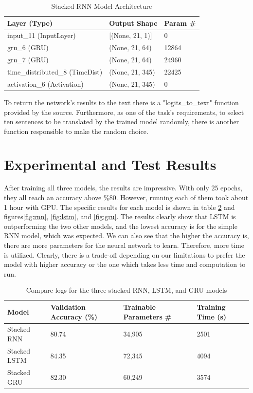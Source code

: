 \documentclass[12pt,oneside,geqno]{article}
\begin{document}
	\begin{table}[h]
		\centering
		\begin{tabular}{|l|l|l|}
			\hline
			Layer (Type)                    & Output Shape        & Param \# \\ \hline
			input\_11 (InputLayer)           & {[}(None, 21, 1){]} & 0        \\ \hline
			gru\_6 (GRU)      & (None, 21, 64)      & 12864     \\ \hline
			gru\_7 (GRU)      & (None, 21, 64)      & 24960     \\ \hline
			time\_distributed\_8 (TimeDist) & (None, 21, 345)     & 22425    \\ \hline
			activation\_6 (Activation)      & (None, 21, 345)     & 0        \\ \hline
		\end{tabular}
		\caption{Stacked RNN Model Architecture}
		\label{t:gru}
	\end{table}
	
	To return the network's results to the text there is a "logits\_to\_text" function provided by the source. Furthermore, as one of the task's requirements, to select ten sentences to be translated by the trained model randomly, there is another function responsible to make the random choice. 
	\pagebreak
	
	\section{Experimental and Test Results}
	After training all three models, the results are impressive. With only 25 epochs, they all reach an accuracy above \%80. However, running each of them took about 1 hour with GPU. The specific results for each model is shown in table \ref{t:compare} and figures\ref{fig:rnn}, \ref{fig:lstm}, and \ref{fig:gru}. The results clearly show that LSTM is outperforming the two other models, and the lowest accuracy is for the simple RNN model, which was expected. We can also see that the higher the accuracy is, there are more parameters for the neural network to learn. Therefore, more time is utilized. Clearly, there is a trade-off depending on our limitations to prefer the model with higher accuracy or the one which takes less time and computation to run. 
	
	\begin{table}[h]
		\begin{tabular}{|l|l|l|l|}
			\hline
			Model        & Validation Accuracy (\%) & Trainable Parameters \# & Training Time (s) \\ \hline
			Stacked RNN  & 80.74                    & 34,905                  & 2501              \\ \hline
			Stacked LSTM & 84.35                    & 72,345                  & 4094              \\ \hline
			Stacked GRU  & 82.30                    & 60,249                  & 3574              \\ \hline
		\end{tabular}
		\caption{Compare logs for the three stacked RNN, LSTM, and GRU models}
		\label{t:compare}
	\end{table}
	
\end{document}
